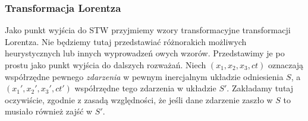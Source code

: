 \documentclass[../main.tex]{subfiles}
\begin{document}
\subsubsection{Transformacja Lorentza}
Jako punkt wyjścia do STW przyjmiemy wzory transformacyjne transformacji Lorentza. Nie będziemy
tutaj przedstawiać różnorakich możliwych heurystycznych lub innych wyprowadzeń owych wzorów.
Przedstawimy je po prostu jako punkt wyjścia do dalszych rozważań. Niech \((x_1,x_2,x_3,ct)\)
oznaczają współrzędne pewnego \textit{zdarzenia} w pewnym inercjalnym układzie odniesienia \(S\), a
\((x_1',x_2',x_3',ct')\) współrzędne tego zdarzenia w układzie \(S'\). Zakładamy tutaj oczywiście,
zgodnie z zasadą względności, że jeśli dane zdarzenie zaszło w \(S\) to musiało również zajść w
\(S'\).\\
\end{document}
